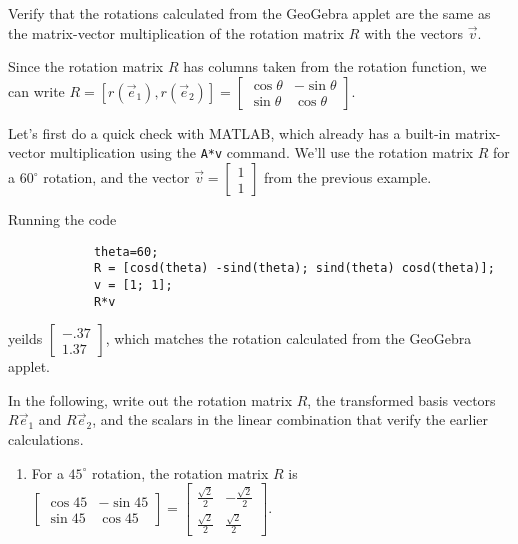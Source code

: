 \documentclass{ximera}
\begin{document}
        \begin{example}

            Verify that the rotations calculated from the GeoGebra applet are the same as the matrix-vector multiplication of the rotation matrix $R$ with the vectors $\vec{v}$.

            Since the rotation matrix $R$ has columns taken from the rotation function, we can write $R=\left[r(\vec{e}_1), r(\vec{e}_2)\right]=\begin{bmatrix} \cos\theta & -\sin\theta \\ \sin\theta & \cos\theta \end{bmatrix}$.

            Let's first do a quick check with MATLAB, which already has a built-in matrix-vector multiplication using the \texttt{A*v} command. We'll use the rotation matrix $R$ for a $60^\circ$ rotation, and the vector $\vec{v}=\begin{bmatrix} 1 \\ 1 \end{bmatrix}$ from the previous example. 

            Running the code

            \begin{verbatim}
            theta=60;
            R = [cosd(theta) -sind(theta); sind(theta) cosd(theta)];
            v = [1; 1];
            R*v
            \end{verbatim}

            yeilds $\begin{bmatrix} -.37 \\ 1.37 \end{bmatrix}$, which matches the rotation calculated from the GeoGebra applet.

            In the following, write out the rotation matrix $R$, the transformed basis vectors $R\vec{e}_1$ and $R\vec{e}_2$, and the scalars in the linear combination that verify the earlier calculations.

            \begin{enumerate}

                \item For a $45^\circ$ rotation, the rotation matrix $R$ is $\begin{bmatrix} \cos 45 & -\sin 45 \\ \sin 45 & \cos 45 \end{bmatrix} = \begin{bmatrix} \frac{\sqrt{2}}{2} & -\frac{\sqrt{2}}{2} \\ \frac{\sqrt{2}}{2} & \frac{\sqrt{2}}{2} \end{bmatrix}$.
                

\end{enumerate}
\end{example}
\end{document}
